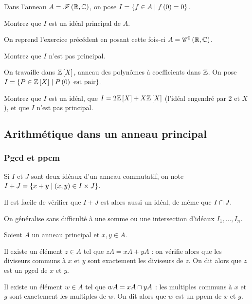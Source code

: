 \begin{exo}
Dans l'anneau \(A=\mathscr{F}\left(\mathbb{R},\mathbb{C}\right)\), on pose \(I=\left\lbrace f\in A\;\middle|\; f\left(0\right)=0\right\rbrace\).

Montrez que \(I\) est un idéal principal de \(A\).
\end{exo}

\begin{exo}
On reprend l'exercice précédent en posant cette fois-ci \(A=\mathscr{C}^{0}\left(\mathbb{R},\mathbb{C}\right)\).

Montrez que \(I\) n'est pas principal.
\end{exo}

\begin{exo}
On travaille dans \(\poly[\Z]\), anneau des polynômes à coefficients dans \(\mathbb{Z}\). On pose \(I=\accol{P\in\poly[\Z]\tq P\paren{0}\text{ est pair}}\).

Montrez que \(I\) est un idéal, que \(I=2\poly[\Z]+X\poly[\Z]\) (\ie l'idéal engendré par \(2\) et \(X\)), et que \(I\) n'est pas principal.
\end{exo}

\subsection{Arithmétique dans un anneau principal}

\subsubsection{Pgcd et ppcm}

Si \(I\) et \(J\) sont deux idéaux d'un anneau commutatif, on note \(I+J=\left\lbrace x+y\;\middle|\;\left(x,y\right)\in I\times J\right\rbrace\).

Il est facile de vérifier que \(I+J\) est alors aussi un idéal, de même que \(I\cap J\).

On généralise sans difficulté à une somme ou une intersection d'idéaux \(I_1,\dots,I_n\).

\begin{prop}
Soient \(A\) un anneau principal et \(x,y\in A\).

Il existe un élément \(z\in A\) tel que \(zA=xA+yA\) : on vérifie alors que les diviseurs communs à \(x\) et \(y\) sont exactement les diviseurs de \(z\). On dit alors que \(z\) est un pgcd de \(x\) et \(y\).

Il existe un élément \(w\in A\) tel que \(wA=xA\cap yA\) : les multiples communs à \(x\) et \(y\) sont exactement les multiples de \(w\). On dit alors que \(w\) est un ppcm de \(x\) et \(y\).
\end{prop}

